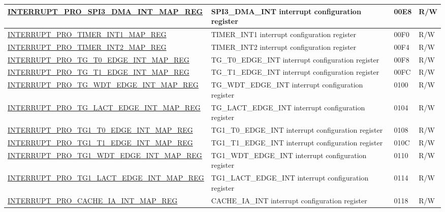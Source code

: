 \begin{longtable}{ | m{9.3cm} | m{9.2cm} | m{1.3cm} | m{1.2cm} | }
\hyperref[regdesc:INTERRUPTPROSPI3DMAINTMAPREG]{INTERRUPT\_PRO\_SPI3\_DMA\_INT\_MAP\_REG} & SPI3\_DMA\_INT interrupt configuration register & \hexprefix{}00E8 & R/W \\ \hline
\hyperref[regdesc:INTERRUPTPROTIMERINT1MAPREG]{INTERRUPT\_PRO\_TIMER\_INT1\_MAP\_REG} & TIMER\_INT1 interrupt configuration register & \hexprefix{}00F0 & R/W \\ \hline
\hyperref[regdesc:INTERRUPTPROTIMERINT2MAPREG]{INTERRUPT\_PRO\_TIMER\_INT2\_MAP\_REG} & TIMER\_INT2 interrupt configuration register & \hexprefix{}00F4 & R/W \\ \hline
\hyperref[regdesc:INTERRUPTPROTGT0EDGEINTMAPREG]{INTERRUPT\_PRO\_TG\_T0\_EDGE\_INT\_MAP\_REG} & TG\_T0\_EDGE\_INT interrupt configuration register & \hexprefix{}00F8 & R/W \\ \hline
\hyperref[regdesc:INTERRUPTPROTGT1EDGEINTMAPREG]{INTERRUPT\_PRO\_TG\_T1\_EDGE\_INT\_MAP\_REG} & TG\_T1\_EDGE\_INT interrupt configuration register & \hexprefix{}00FC & R/W \\ \hline
\hyperref[regdesc:INTERRUPTPROTGWDTEDGEINTMAPREG]{INTERRUPT\_PRO\_TG\_WDT\_EDGE\_INT\_MAP\_REG} & TG\_WDT\_EDGE\_INT interrupt configuration register & \hexprefix{}0100 & R/W \\ \hline
\hyperref[regdesc:INTERRUPTPROTGLACTEDGEINTMAPREG]{INTERRUPT\_PRO\_TG\_LACT\_EDGE\_INT\_MAP\_REG} & TG\_LACT\_EDGE\_INT interrupt configuration register & \hexprefix{}0104 & R/W \\ \hline
\hyperref[regdesc:INTERRUPTPROTG1T0EDGEINTMAPREG]{INTERRUPT\_PRO\_TG1\_T0\_EDGE\_INT\_MAP\_REG} & TG1\_T0\_EDGE\_INT interrupt configuration register & \hexprefix{}0108 & R/W \\ \hline
\hyperref[regdesc:INTERRUPTPROTG1T1EDGEINTMAPREG]{INTERRUPT\_PRO\_TG1\_T1\_EDGE\_INT\_MAP\_REG} & TG1\_T1\_EDGE\_INT interrupt configuration register & \hexprefix{}010C & R/W \\ \hline
\hyperref[regdesc:INTERRUPTPROTG1WDTEDGEINTMAPREG]{INTERRUPT\_PRO\_TG1\_WDT\_EDGE\_INT\_MAP\_REG} & TG1\_WDT\_EDGE\_INT interrupt configuration register & \hexprefix{}0110 & R/W \\ \hline
\hyperref[regdesc:INTERRUPTPROTG1LACTEDGEINTMAPREG]{INTERRUPT\_PRO\_TG1\_LACT\_EDGE\_INT\_MAP\_REG} & TG1\_LACT\_EDGE\_INT interrupt configuration register & \hexprefix{}0114 & R/W \\ \hline
\hyperref[regdesc:INTERRUPTPROCACHEIAINTMAPREG]{INTERRUPT\_PRO\_CACHE\_IA\_INT\_MAP\_REG} & CACHE\_IA\_INT interrupt configuration register & \hexprefix{}0118 & R/W \\ \hline

\end{longtable}
